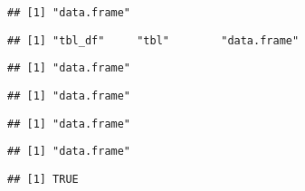 \documentclass[krantz2]{krantz}\usepackage{knitr}
\begin{document}
\begin{explainbox}
\begin{knitrout}\footnotesize
{}\color{fgcolor}\begin{kframe}
\begin{alltt}
\end{alltt}
\begin{verbatim}
## [1] "data.frame"
\end{verbatim}
\begin{alltt}
\end{alltt}
\begin{verbatim}
## [1] "tbl_df"     "tbl"        "data.frame"
\end{verbatim}
\begin{alltt}
\hlstd{(}
\end{alltt}
\begin{verbatim}
## [1] "data.frame"
\end{verbatim}
\begin{alltt}
\hlstd{(}
\end{alltt}
\begin{verbatim}
## [1] "data.frame"
\end{verbatim}
\begin{alltt}
\hlstd{(}  \hlstd{=} \hlopt{-}\hlopt{:-}\hlstd{))}
\end{alltt}
\begin{verbatim}
## [1] "data.frame"
\end{verbatim}
\begin{alltt}
\hlstd{(}  \hlstd{=} \hlopt{-}\hlopt{:-}\hlstd{))}
\end{alltt}
\begin{verbatim}
## [1] "data.frame"
\end{verbatim}
\begin{alltt}
\hlstd{(}  \hlstd{=} \hlopt{-}\hlopt{:-}\hlstd{),}   \hlstd{=} \hlopt{-}\hlopt{:-}\hlstd{))}
\end{alltt}
\begin{verbatim}
## [1] TRUE
\end{verbatim}
\end{kframe}
\end{knitrout}
\end{explainbox}
\end{document}
